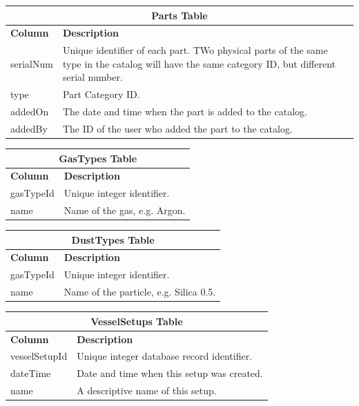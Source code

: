 \begin{table}[h!]
\centering
\begin{tabular}{l p{12cm}}
\multicolumn{2}{c}{\bf Parts Table} \\ \hline
{\bf Column} & {\bf Description}\\ \hline
serialNum & Unique identifier of each part. TWo physical parts of the same type in the catalog will have the same category ID, but different serial number.\\ \hline
type & Part Category ID.\\ \hline
addedOn & The date and time when the part is added to the catalog. \\ \hline
addedBy & The ID of the user who added the part to the catalog.\\ \hline
\end{tabular}
\end{table}

\begin{table}[h!]
\centering
\begin{tabular}{l p{12cm}}
\multicolumn{2}{c}{\bf GasTypes Table} \\ \hline
{\bf Column} & {\bf Description}\\ \hline
gasTypeId & Unique integer identifier.\\ \hline
name & Name of the gas, e.g. Argon.\\ \hline
\end{tabular}
\end{table}

\begin{table}[h!]
\centering
\begin{tabular}{l p{12cm}}
\multicolumn{2}{c}{\bf DustTypes Table} \\ \hline
{\bf Column} & {\bf Description}\\ \hline
gasTypeId & Unique integer identifier.\\ \hline
name & Name of the particle, e.g. Silica 0.5.\\ \hline
\end{tabular}
\end{table}

\begin{table}[h!]
\centering
\begin{tabular}{l p{12cm}}
\multicolumn{2}{c}{\bf VesselSetups Table} \\ \hline
{\bf Column} & {\bf Description}\\ \hline
vesselSetupId & Unique integer database record identifier.\\ \hline
dateTime & Date and time when this setup was created.\\ \hline
name & A descriptive name of this setup.\\ \hline
\end{tabular}
\end{table}

